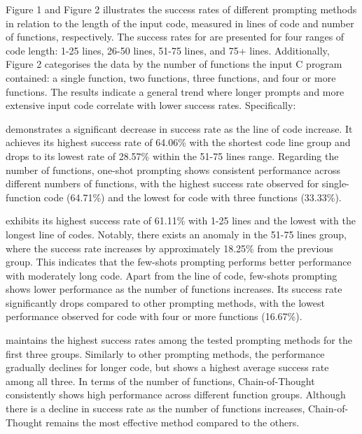 \documentclass[onecolumn]{NobArticle}
\begin{document}
\vspace{-0.3cm}
Figure 1 and Figure 2 illustrates the success rates of different prompting methods  in relation to the length of the input code, measured in lines of code and number of functions, respectively. The success rates for are presented for four ranges of code length: 1-25 lines, 26-50 lines, 51-75 lines, and 75+ lines. Additionally, Figure 2 categorises the data by the number of functions the input C program contained: a single function, two functions, three functions, and four or more functions. The results indicate a general trend where longer prompts and more extensive input code correlate with lower success rates. Specifically:
\begin{description}[font=$\bullet$\scshape\bfseries]
    \item[One-shot prompting] demonstrates a significant decrease in success rate as the line of code increase. It achieves its highest success rate of 64.06\% with the shortest code line group and drops to its lowest rate of 28.57\% within the 51-75 lines range. Regarding the number of functions, one-shot prompting shows consistent performance across different numbers of functions, with the highest success rate observed for single-function code (64.71\%) and the lowest for code with three functions (33.33\%).
    \vspace{0.2cm}
    \item[Few-shots prompting] exhibits its highest success rate of 61.11\% with 1-25 lines and the lowest with the longest line of codes. Notably, there exists an anomaly in the 51-75 lines group, where the success rate increases by approximately 18.25\% from the previous group. This indicates that the few-shots prompting performs better performance with moderately long code.  Apart from the line of code, few-shots prompting shows lower performance as the number of functions increases. Its success rate significantly drops compared to other prompting methods, with the lowest performance observed for code with four or more functions (16.67\%).

    \vspace{0.2cm}
    \item[Chain-of-Thought prompting] maintains the highest success rates among the tested prompting methods for the first three groups. Similarly to other prompting methods, the performance gradually declines for longer code, but shows a highest average success rate among all three. In terms of the number of functions, Chain-of-Thought consistently shows high performance across different function groups. Although there is a decline in success rate as the number of functions increases, Chain-of-Thought remains the most effective method compared to the others.

\end{description}
\end{document}
